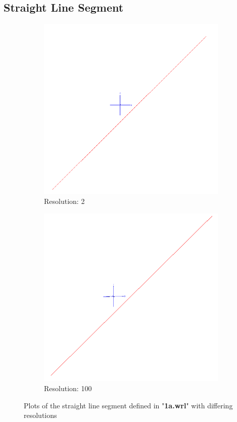 \documentclass[acmlarge,nonacm=true]{acmart}
\begin{document}
\subsection{Straight Line Segment}
\begin{figure}[H]
	\begin{subfigure}{.5\textwidth}
	  \centering
	  \includegraphics[width=.8\linewidth]{fig/1a2}
	  \caption{Resolution: 2}
	\end{subfigure}%
	\begin{subfigure}{.5\textwidth}
	  \centering
	  \includegraphics[width=.8\linewidth]{fig/1a100}
	  \caption{Resolution: 100}
	\end{subfigure}
	\caption{Plots of the straight line segment defined in "\textbf{1a.wrl}" with differing resolutions}
	\label{fig:1a}
\end{figure}
\end{document}
